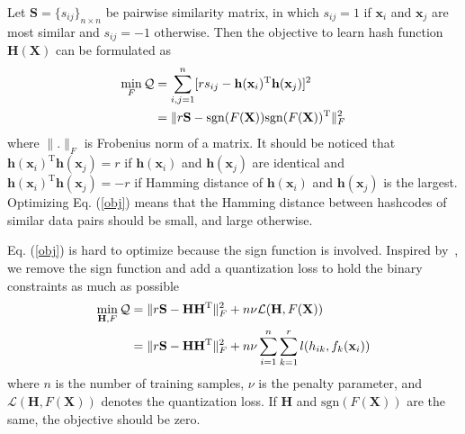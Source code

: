 \documentclass[conference]{IEEEtran}
\begin{document}
Let $\mathbf{S} = \{s_{ij}\}_{n \times n}$ be pairwise similarity matrix, in which $s_{ij}=1$ if $\mathbf{x}_i$ and $\mathbf{x}_j$ are most similar and $s_{ij}=-1$ otherwise. Then the objective to learn hash function $\mathbf{H}(\mathbf{X})$ can be formulated as
\begin{equation}
\begin{split}
\min_{F} \mathcal{Q} &= \sum_{i,j=1}^n [r s_{ij}-\mathbf{h}(\mathbf{x}_i)^{\mathrm{T}} \mathbf{h}(\mathbf{x}_j)]^2 \\
&= \Arrowvert r\mathbf{S} - \mathrm{sgn}(F(\mathbf{X}))\mathrm{sgn}(F(\mathbf{X}))^\mathrm{T} \Arrowvert_F^2
\label{obj}
\end{split}
\end{equation}
where $\| . \|_F$ is Frobenius norm of a matrix. It should be noticed that $\mathbf{h}(\mathbf{x}_i)^{\mathrm{T}} \mathbf{h}(\mathbf{x}_j)=r$ if $\mathbf{h}(\mathbf{x}_i)$ and $\mathbf{h}(\mathbf{x}_j)$ are identical and $\mathbf{h}(\mathbf{x}_i)^{\mathrm{T}} \mathbf{h}(\mathbf{x}_j) = -r$ if Hamming distance of $\mathbf{h}(\mathbf{x}_i)$ and $\mathbf{h}(\mathbf{x}_j)$ is the largest. Optimizing Eq. (\ref{obj}) means that the Hamming distance between hashcodes of similar data pairs should be small, and large otherwise.

Eq. (\ref{obj}) is hard to optimize because the sign function is involved. Inspired by~\cite{liu2014discrete}, we remove the sign function and add a quantization loss to hold the binary constraints as much as possible
\begin{equation}
\begin{split}
\min_{\mathbf{H}, F} \mathcal{Q} &= \Arrowvert r\mathbf{S} - \mathbf{H} \mathbf{H}^\mathrm{T} \Arrowvert_F^2 + n \nu \mathcal{L}(\mathbf{H}, F(\mathbf{X})) \\
&= \Arrowvert r\mathbf{S} - \mathbf{H} \mathbf{H}^\mathrm{T} \Arrowvert_F^2 + n \nu  \sum_{i=1}^n \sum_{k=1}^r l(h_{ik}, f_k(\mathbf{x}_i))
\end{split}
\label{dis_obj_ori}
\end{equation}
where $n$ is the number of training samples, $\nu$ is the penalty parameter, and $\mathcal{L}(\mathbf{H}, F(\mathbf{X}))$ denotes the quantization loss. If $\mathbf{H}$ and $\mathrm{sgn}(F(\mathbf{X}))$ are the same, the objective should be zero.
\end{document}
